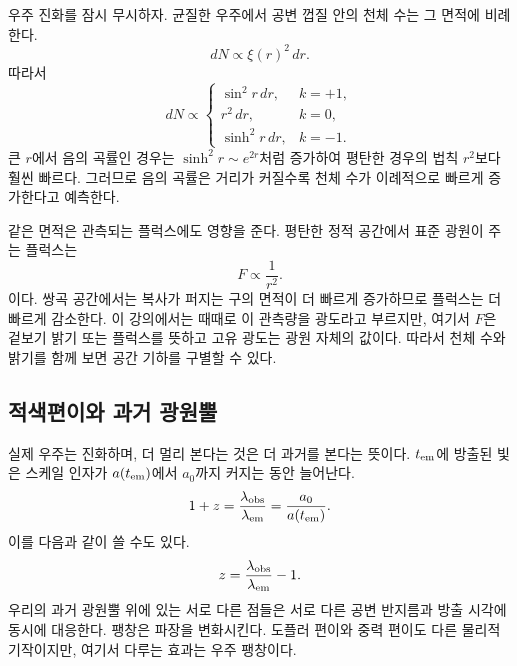 우주 진화를 잠시 무시하자. 균질한 우주에서 공변 껍질 안의 천체 수는 그 면적에 비례한다.
\begin{equation}
dN\propto \xi(r)^2\,dr.
\label{eq:c06-shell-count}
\end{equation}
따라서
\begin{equation}
dN\propto
\begin{cases}
\sin^2r\,dr, & k=+1,\\
r^2\,dr, & k=0,\\
\sinh^2r\,dr, & k=-1.
\end{cases}
\end{equation}
큰 \(r\)에서 음의 곡률인 경우는 \(\sinh^2r\sim e^{2r}\)처럼 증가하여 평탄한 경우의 법칙 \(r^2\)보다 훨씬 빠르다. 그러므로 음의 곡률은 거리가 커질수록 천체 수가 이례적으로 빠르게 증가한다고 예측한다.

같은 면적은 관측되는 플럭스에도 영향을 준다. 평탄한 정적 공간에서 표준 광원이 주는 플럭스는
\begin{equation}
F\propto\frac{1}{r^2}.
\end{equation}
이다. 쌍곡 공간에서는 복사가 퍼지는 구의 면적이 더 빠르게 증가하므로 플럭스는 더 빠르게 감소한다. 이 강의에서는 때때로 이 관측량을 광도라고 부르지만, 여기서 \(F\)은 겉보기 밝기 또는 플럭스를 뜻하고 고유 광도는 광원 자체의 값이다. 따라서 천체 수와 밝기를 함께 보면 공간 기하를 구별할 수 있다.

\subsection{적색편이와 과거 광원뿔}

실제 우주는 진화하며, 더 멀리 본다는 것은 더 과거를 본다는 뜻이다. \(t_{\rm em}\)에 방출된 빛은 스케일 인자가 \(a(t_{\rm em})\)에서 \(a_0\)까지 커지는 동안 늘어난다.
\begin{equation}
1+z
=\frac{\lambda_{\rm obs}}{\lambda_{\rm em}}
=\frac{a_0}{a(t_{\rm em})}.
\label{eq:c06-redshift}
\end{equation}
이를 다음과 같이 쓸 수도 있다.
\begin{equation}
z=\frac{\lambda_{\rm obs}}{\lambda_{\rm em}}-1.
\end{equation}
우리의 과거 광원뿔 위에 있는 서로 다른 점들은 서로 다른 공변 반지름과 방출 시각에 동시에 대응한다. 팽창은 파장을 변화시킨다. 도플러 편이와 중력 편이도 다른 물리적 기작이지만, 여기서 다루는 효과는 우주 팽창이다.

\begin{classroomqa}
\end{classroomqa}

